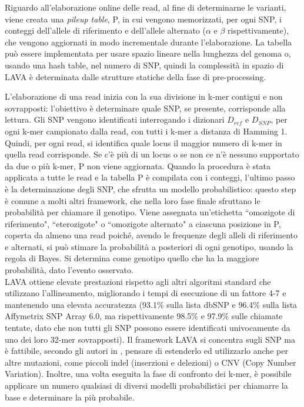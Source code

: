 \documentclass[../main.tex]{subfiles}
\begin{document}
Riguardo all’elaborazione online delle read, al fine di determinarne le varianti, viene creata una \textit{pileup table}, P, in cui vengono memorizzati, per ogni SNP, i conteggi dell'allele di riferimento e dell'allele alternato ($\alpha$ e $\beta$ rispettivamente), che vengono aggiornati in modo incrementale durante l'elaborazione. La tabella può essere implementata per usare spazio lineare nella lunghezza del genoma o, usando una hash table, nel numero di SNP, quindi la complessità in spazio di LAVA è determinata dalle strutture statiche della fase di pre-processing.

L'elaborazione di una read inizia con la sua divisione in k-mer contigui e non sovrapposti: l’obiettivo è determinare quale SNP, se presente, corrisponde alla lettura. Gli SNP vengono identificati interrogando i dizionari $D_{ref}$ e $D_{SNP}$, per ogni k-mer campionato dalla read, con tutti i k-mer a distanza di Hamming 1. Quindi, per ogni read, si identifica quale locus il maggior numero di k-mer in quella read corrisponde. Se c’è più di un locus o se non ce n’è nessuno supportato da due o più k-mer, P non viene aggiornata. Quando la procedura è stata applicata a tutte le read e la tabella P è compilata con i conteggi, l’ultimo passo è la determinazione degli SNP, che sfrutta un modello probabilistico: questo step è comune a molti altri framework, che nella loro fase finale sfruttano le probabilità per chiamare il genotipo. Viene assegnata un'etichetta ``omozigote di riferimento", ``eterozigote" o ``omozigote alternato" a ciascuna posizione in P, coperta da almeno una read poiché, avendo le frequenze degli alleli di riferimento e alternati, si può stimare la probabilità a posteriori di ogni genotipo, usando la regola di Bayes. Si determina come genotipo quello che ha la maggiore probabilità, dato l’evento osservato. \\

LAVA ottiene elevate prestazioni rispetto agli altri algoritmi standard che utilizzano l’allineamento, migliorando i tempi di esecuzione di un fattore 4-7 e mantenendo una elevata accuratezza (93.1\% sulla lista dbSNP e 96.4\% sulla lista Affymetrix SNP Array 6.0, ma rispettivamente 98.5\% e 97.9\% sulle chiamate tentate, dato che non tutti gli SNP possono essere identificati univocamente da uno dei loro 32-mer sovrapposti).
Il framework LAVA si concentra sugli SNP ma è fattibile, secondo gli autori in  \cite{shajii2016lava}, pensare di estenderlo ed utilizzarlo anche per altre mutazioni, come piccoli indel (inserzioni e delezioni) o CNV (Copy Number Variation). Inoltre, una volta eseguita la fase di confronto dei k-mer, è possibile applicare un numero qualsiasi di diversi modelli probabilistici per chiamarre la base e determinare la più probabile. 
\end{document}
